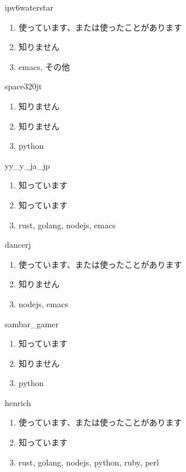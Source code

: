 \begin{prework}{ ipv6waterstar }
  \begin{enumerate}
  \item 使っています、または使ったことがあります
  \item 知りません
  \item emacs, その他
  \end{enumerate}
\end{prework}

\begin{prework}{ space320jt }
  \begin{enumerate}
  \item 知りません
  \item 知りません
  \item python
  \end{enumerate}
\end{prework}

\begin{prework}{ yy\_y\_ja\_jp }
  \begin{enumerate}
  \item 知っています
  \item 知っています
  \item rust, golang, nodejs, emacs
  \end{enumerate}
\end{prework}

\begin{prework}{ dancerj }
  \begin{enumerate}
  \item 使っています、または使ったことがあります
  \item 知りません
  \item nodejs, emacs
  \end{enumerate}
\end{prework}

\begin{prework}{ sambar\_gamer }
  \begin{enumerate}
  \item 知っています
  \item 知りません
  \item python
  \end{enumerate}
\end{prework}

\begin{prework}{ henrich }
  \begin{enumerate}
  \item 使っています、または使ったことがあります
  \item 知っています
  \item rust, golang, nodejs, python, ruby, perl
  \end{enumerate}
\end{prework}
